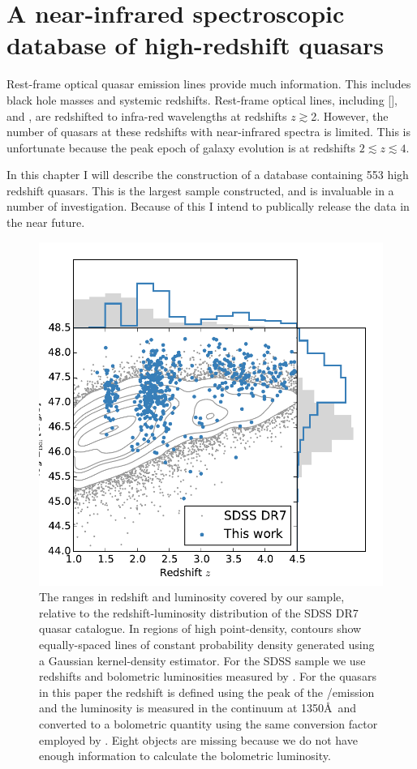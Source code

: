 
\chapter{A near-infrared spectroscopic database of high-redshift quasars}\label{ch:chapter02}

Rest-frame optical quasar emission lines provide much information. 
This includes black hole masses and systemic redshifts. 
Rest-frame optical lines, including [], \hb and \ha, are redshifted to infra-red wavelengths at redshifts $z\gtrsim$2. 
However, the number of quasars at these redshifts with near-infrared spectra is limited. 
This is unfortunate because the peak epoch of galaxy evolution is at redshifts $2\lesssim z \lesssim 4$. 

In this chapter I will describe the construction of a database containing 553 high redshift quasars. 
This is the largest sample constructed, and is invaluable in a number of investigation. 
Because of this I intend to publically release the data in the near future. 

\begin{figure}
    \includegraphics[width=0.8\columnwidth]{figures/chapter02/luminosity_z.pdf} 
    \caption{The ranges in redshift and luminosity covered by our sample, relative to the redshift-luminosity distribution of the SDSS DR7 quasar catalogue. In regions of high point-density, contours show equally-spaced lines of constant probability density generated using a Gaussian kernel-density estimator. For the SDSS sample we use \citet{hewett10} redshifts and bolometric luminosities measured by \citet{shen11}. For the quasars in this paper the redshift is defined using the peak of the \hans/\hb emission and the luminosity is measured in the continuum at 1350\AA\, and converted to a bolometric quantity using the same conversion factor employed by \citet{shen11}. Eight objects are missing because we do not have enough information to calculate the bolometric luminosity.}     
    \label{fig:lzplane}
\end{figure}

